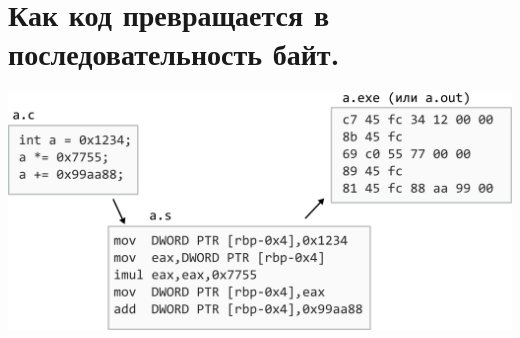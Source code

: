 \documentclass[10pt]{article}
\begin{document}

\section*{Как код превращается в последовательность байт.}
\begin{center}
\includegraphics[scale=0.9]{../images/code_to_hex.png}
\end{center}
\end{document}
